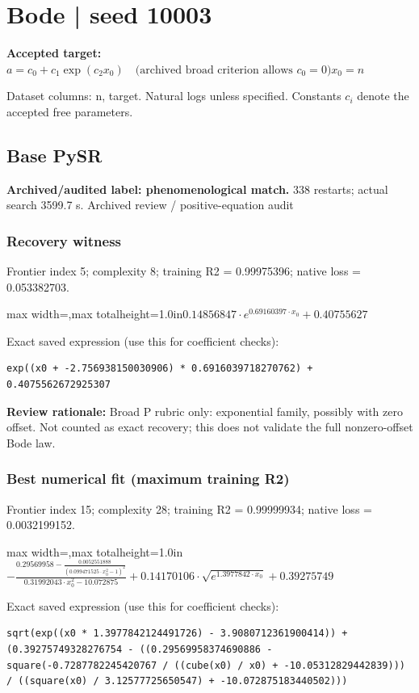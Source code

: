 \documentclass[10pt,letterpaper,landscape]{article}
\begin{document}
\section*{Bode | seed 10003}
\textbf{Accepted target:} $\displaystyle a=c_0+c_1\exp(c_2x_0)\quad\text{(archived broad criterion allows }c_0=0\text{)}$\hfill $x_0=n$\par
{\small Dataset columns: n, target. Natural logs unless specified. Constants $c_i$ denote the accepted free parameters.}\par\medskip
\begin{minipage}[t]{0.485\textwidth}
\subsection*{Base PySR}
\textbf{Archived/audited label: phenomenological match.} 338 restarts; actual search 3599.7 s.
{\small Archived review / positive-equation audit}
\subsubsection*{Recovery witness}
Frontier index 5; complexity 8; training R2 = 0.99975396; native loss = 0.053382703.
\begin{center}\begin{adjustbox}{max width=\linewidth,max totalheight=1.0in}$\displaystyle 0.14856847 \cdot e^{0.69160397 \cdot x_{0}} + 0.40755627$\end{adjustbox}\end{center}
{\scriptsize Exact saved expression (use this for coefficient checks):}
\begin{lstlisting}
exp((x0 + -2.756938150030906) * 0.6916039718270762) + 0.4075562672925307
\end{lstlisting}
{\small\textbf{Review rationale:} Broad P rubric only: exponential family, possibly with zero offset. Not counted as exact recovery; this does not validate the full nonzero-offset Bode law.}
\subsubsection*{Best numerical fit (maximum training R2)}
Frontier index 15; complexity 28; training R2 = 0.99999934; native loss = 0.0032199152.
\begin{center}\begin{adjustbox}{max width=\linewidth,max totalheight=1.0in}$\displaystyle - \frac{0.29569958 - \frac{0.0052551888}{\left(0.099471525 \cdot x_{0}^{2} - 1\right)^{2}}}{0.31992043 \cdot x_{0}^{2} - 10.072875} + 0.14170106 \cdot \sqrt{e^{1.3977842 \cdot x_{0}}} + 0.39275749$\end{adjustbox}\end{center}
{\scriptsize Exact saved expression (use this for coefficient checks):}
\begin{lstlisting}
sqrt(exp((x0 * 1.3977842124491726) - 3.9080712361900414)) + (0.39275749328276754 - ((0.29569958374690886 - square(-0.7287782245420767 / ((cube(x0) / x0) + -10.05312829442839))) / ((square(x0) / 3.12577725650547) + -10.072875183440502)))
\end{lstlisting}
\end{minipage}\hfill
\end{document}
